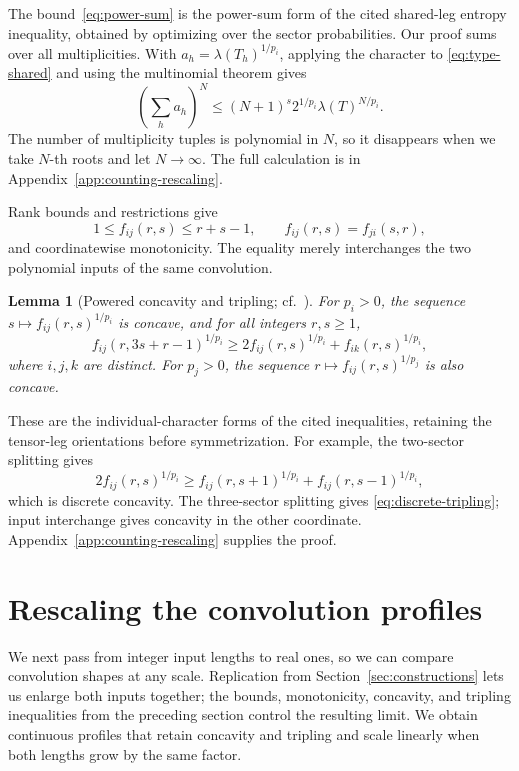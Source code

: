 \documentclass[11pt]{article}
\newtheorem{lemma}[theorem]{Lemma}
\begin{document}
The bound~\eqref{eq:power-sum} is the power-sum form of the cited
shared-leg entropy inequality, obtained by optimizing over the sector
probabilities. Our proof sums over all multiplicities. With
$a_h=\lambda(T_h)^{1/p_i}$, applying the character to
\eqref{eq:type-shared} and using the multinomial theorem gives
\[
 \left(\sum_h a_h\right)^N
 \le (N+1)^s2^{1/p_i}\lambda(T)^{N/p_i}.
\]
The number of multiplicity tuples is polynomial in $N$, so it disappears
when we take $N$-th roots and let $N\to\infty$.
The full calculation is in Appendix~\ref{app:counting-rescaling}.

Rank bounds and restrictions give
\begin{equation}\label{eq:profile-rank}
 1\le f_{ij}(r,s)\le r+s-1,
 \qquad f_{ij}(r,s)=f_{ji}(s,r),
\end{equation}
and coordinatewise monotonicity. The equality merely interchanges the
two polynomial inputs of the same convolution.

\begin{lemma}[Powered concavity and tripling; cf.\ {\cite[Lemmas~4.1 and~4.2]{openai-2026-matrix-nine-fourths}}]\label{lem:discrete}
For $p_i>0$, the sequence $s\mapsto f_{ij}(r,s)^{1/p_i}$ is concave,
and for all integers $r,s\ge1$,
\begin{equation}\label{eq:discrete-tripling}
 f_{ij}(r,3s+r-1)^{1/p_i}
 \ge2f_{ij}(r,s)^{1/p_i}+f_{ik}(r,s)^{1/p_i},
\end{equation}
where $i,j,k$ are distinct. For $p_j>0$, the sequence
$r\mapsto f_{ij}(r,s)^{1/p_j}$ is also concave.
\end{lemma}

These are the individual-character forms of the cited inequalities,
retaining the tensor-leg orientations before symmetrization.
For example, the two-sector splitting gives
\[
 2f_{ij}(r,s)^{1/p_i}
 \ge f_{ij}(r,s+1)^{1/p_i}+f_{ij}(r,s-1)^{1/p_i},
\]
which is discrete concavity. The three-sector splitting gives
\eqref{eq:discrete-tripling}; input interchange gives concavity in the
other coordinate. Appendix~\ref{app:counting-rescaling} supplies the proof.

\section{Rescaling the convolution profiles}\label{sec:homogeneous}

We next pass from integer input lengths to real ones, so we can compare
convolution shapes at any scale. Replication from
Section~\ref{sec:constructions} lets us enlarge both inputs together;
the bounds, monotonicity, concavity, and tripling inequalities from the
preceding section control the resulting limit. We obtain continuous
profiles that retain concavity and tripling and scale linearly when both
lengths grow by the same factor.
\end{document}

